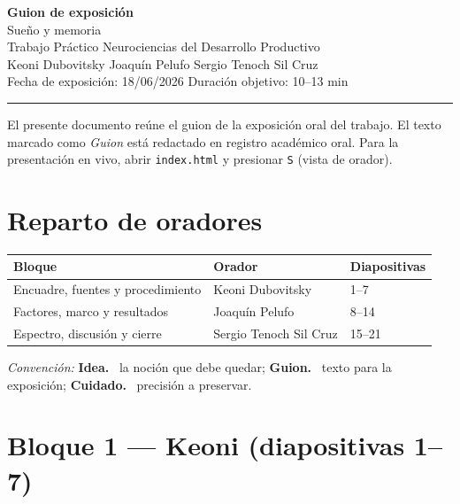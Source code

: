 \documentclass[11pt,a4paper]{article}
\newcommand{\lab}[1]{\textbf{\color{ink}#1}\ }
\begin{document}
\begin{center}
  {\LARGE\bfseries\color{indigo} Guion de exposición}\\[0.35em]
  {\large Sueño y memoria}\\[0.7em]
  {\normalsize Trabajo Práctico \textemdash{} Neurociencias del Desarrollo Productivo}\\[0.3em]
  {\small Keoni Dubovitsky \quad\textbullet\quad Joaquín Pelufo \quad\textbullet\quad Sergio Tenoch Sil Cruz}\\[0.2em]
  {\small Fecha de exposición: 18/06/2026 \quad\textbullet\quad Duración objetivo: 10--13 min}
\end{center}
\vspace{0.4em}
{\color{rule}\hrule}
\vspace{0.8em}

\noindent\small
El presente documento reúne el guion de la exposición oral del trabajo. El texto marcado como
\textit{Guion} está redactado en registro académico oral. Para la presentación en vivo, abrir
\texttt{index.html} y presionar \texttt{S} (vista de orador).
\normalsize

\section{Reparto de oradores}

\begin{center}
\begin{tabular}{@{}lll@{}}
\toprule
\textbf{Bloque} & \textbf{Orador} & \textbf{Diapositivas} \\
\midrule
Encuadre, fuentes y procedimiento & Keoni Dubovitsky & 1--7 \\
Factores, marco y resultados & Joaquín Pelufo & 8--14 \\
Espectro, discusión y cierre & Sergio Tenoch Sil Cruz & 15--21 \\
\bottomrule
\end{tabular}
\end{center}

\noindent\textit{Convención:} \lab{Idea.} la noción que debe quedar; \lab{Guion.} texto para la
exposición; \lab{Cuidado.} precisión a preservar.

\section{Bloque 1 — Keoni (diapositivas 1--7)}
\end{document}
